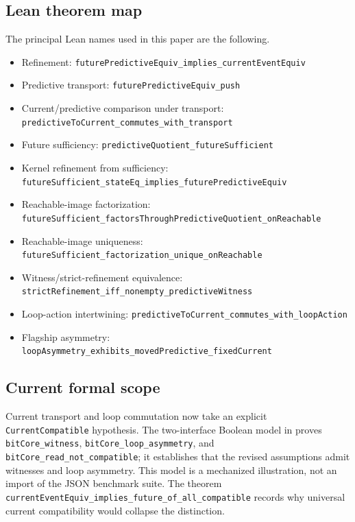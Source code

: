 \documentclass[11pt]{article}
\theoremstyle{definition}
\begin{document}
\subsection{Lean theorem map}\label{appsubsec:lean-theorem-map}
The principal Lean names used in this paper are the following.
\begin{itemize}[leftmargin=*]\small
\item Refinement:
\nolinkurl{futurePredictiveEquiv_implies_currentEventEquiv}

\item Predictive transport:
\nolinkurl{futurePredictiveEquiv_push}

\item Current/predictive comparison under transport:
\nolinkurl{predictiveToCurrent_commutes_with_transport}

\item Future sufficiency:
\nolinkurl{predictiveQuotient_futureSufficient}

\item Kernel refinement from sufficiency:
\nolinkurl{futureSufficient_stateEq_implies_futurePredictiveEquiv}

\item Reachable-image factorization:
\nolinkurl{futureSufficient_factorsThroughPredictiveQuotient_onReachable}

\item Reachable-image uniqueness:
\nolinkurl{futureSufficient_factorization_unique_onReachable}

\item Witness/strict-refinement equivalence:
\nolinkurl{strictRefinement_iff_nonempty_predictiveWitness}

\item Loop-action intertwining:
\nolinkurl{predictiveToCurrent_commutes_with_loopAction}

\item Flagship asymmetry:
\nolinkurl{loopAsymmetry_exhibits_movedPredictive_fixedCurrent}
\end{itemize}

\subsection{Current formal scope}\label{appsubsec:lean-scope}
Current transport and loop commutation now take an explicit \nolinkurl{CurrentCompatible} hypothesis. The two-interface Boolean model in  proves \nolinkurl{bitCore_witness}, \nolinkurl{bitCore_loop_asymmetry}, and \nolinkurl{bitCore_read_not_compatible}; it establishes that the revised assumptions admit witnesses and loop asymmetry. This model is a mechanized illustration, not an import of the JSON benchmark suite. The theorem \nolinkurl{currentEventEquiv_implies_future_of_all_compatible} records why universal current compatibility would collapse the distinction.
\end{document}
